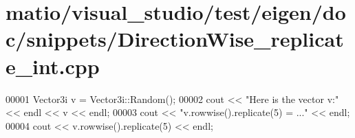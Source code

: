 \hypertarget{matio_2visual__studio_2test_2eigen_2doc_2snippets_2_direction_wise__replicate__int_8cpp_source}{}\section{matio/visual\+\_\+studio/test/eigen/doc/snippets/\+Direction\+Wise\+\_\+replicate\+\_\+int.cpp}
\label{matio_2visual__studio_2test_2eigen_2doc_2snippets_2_direction_wise__replicate__int_8cpp_source}

\begin{DoxyCode}
00001 Vector3i v = Vector3i::Random();
00002 cout << \textcolor{stringliteral}{"Here is the vector v:"} << endl << v << endl;
00003 cout << \textcolor{stringliteral}{"v.rowwise().replicate(5) = ..."} << endl;
00004 cout << v.rowwise().replicate(5) << endl;
\end{DoxyCode}
